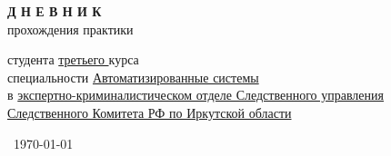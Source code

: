 \begin{titlepage}

\vspace*{76mm}


\begin{center}
\begin{minipage}[H]{0.6\textwidth}
	\begin{center}
		{\bf \Large Д Н Е В Н И К} \\
		прохождения практики
	\end{center}
	студента 
	\uline{третьего \hfill} курса \\
	специальности \uline{Автоматизированные системы \hfill} \\
	в \uline{экспертно-криминалистическом отделе Следственного управления Следственного Комитета РФ по Иркутской области}
\end{minipage}
 \end{center}

  \vfill

  \begin{center}
  \city \ 
  \onlyyear\today
  \end{center}
  \makeatother
\end{titlepage}